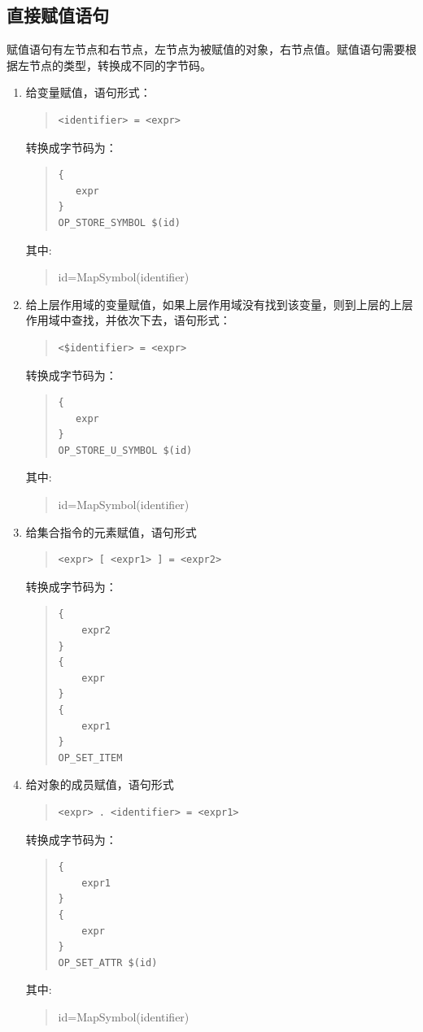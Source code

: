 \subsection{直接赋值语句}
赋值语句有左节点和右节点，左节点为被赋值的对象，右节点值。赋值语句需要根据左节点的类型，转换成不同的字节码。
\begin{enumerate}
\item 给变量赋值，语句形式：
\begin{quote}
\begin{verbatim}
<identifier> = <expr>
\end{verbatim}
\end{quote}
转换成字节码为：
\begin{quote}
\begin{verbatim}
{
   expr
}
OP_STORE_SYMBOL $(id)
\end{verbatim}
\end{quote}
其中:
\begin{quote}
id=MapSymbol(identifier)
\end{quote}
\item 给上层作用域的变量赋值，如果上层作用域没有找到该变量，则到上层的上层作用域中查找，并依次下去，语句形式：
\begin{quote}
\begin{verbatim}
<$identifier> = <expr>
\end{verbatim}
\end{quote}
转换成字节码为：
\begin{quote}
\begin{verbatim}
{
   expr
}
OP_STORE_U_SYMBOL $(id)
\end{verbatim}
\end{quote}
其中:
\begin{quote}
id=MapSymbol(identifier)
\end{quote}
\item 给集合指令的元素赋值，语句形式
\begin{quote}
\begin{verbatim}
<expr> [ <expr1> ] = <expr2>
\end{verbatim}
\end{quote}
转换成字节码为：
\begin{quote}
\begin{verbatim}
{
    expr2
}
{
    expr  
}
{
    expr1
}
OP_SET_ITEM
\end{verbatim}
\end{quote}
\item 给对象的成员赋值，语句形式
\begin{quote}
\begin{verbatim}
<expr> . <identifier> = <expr1>
\end{verbatim}
\end{quote}
转换成字节码为：
\begin{quote}
\begin{verbatim}
{
    expr1
}
{
    expr  
}
OP_SET_ATTR $(id)
\end{verbatim}
\end{quote}
其中:
\begin{quote}
id=MapSymbol(identifier)
\end{quote}
\end{enumerate}

